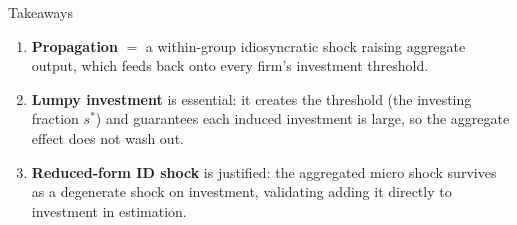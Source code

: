 \documentclass[9pt]{beamer}
\begin{document}
\begin{frame}{Takeaways}
	\begin{enumerate}
		\item \textbf{Propagation} $=$ a within-group idiosyncratic shock raising aggregate output, which feeds back onto every firm's investment threshold.
		\item \textbf{Lumpy investment} is essential: it creates the threshold (the investing fraction $s^{*}$) and guarantees each induced investment is large, so the aggregate effect does not wash out.
		\item \textbf{Reduced-form ID shock} is justified: the aggregated micro shock survives as a degenerate shock on investment, validating adding it directly to investment in estimation.
	\end{enumerate}
\end{frame}
\end{document}
